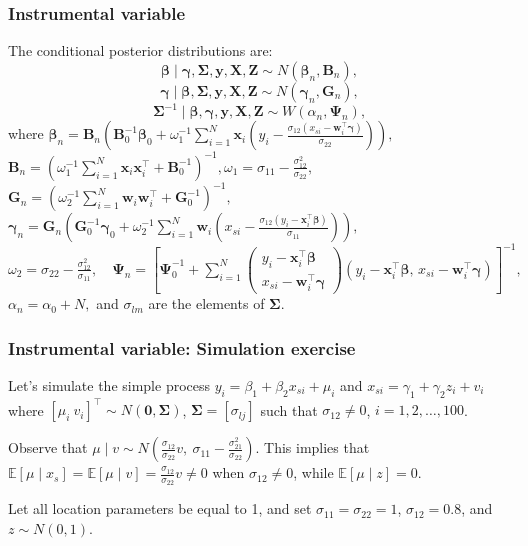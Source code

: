 \documentclass[12pt, compress]{beamer}
\begin{document}
\begin{frame}
	\frametitle{Instrumental variable}
The conditional posterior distributions are:
\begin{equation*}
	\bm{\beta} \mid \bm{\gamma}, \bm{\Sigma}, \bm{y}, \bm{X}, \bm{Z} \sim N(\bm{\beta}_n, \bm{B}_n),
\end{equation*}
\begin{equation*}
	\bm{\gamma} \mid \bm{\beta}, \bm{\Sigma}, \bm{y}, \bm{X}, \bm{Z} \sim N(\bm{\gamma}_n, \bm{G}_n),
\end{equation*}
\begin{equation*}
	\bm{\Sigma}^{-1} \mid \bm{\beta}, \bm{\gamma}, \bm{y}, \bm{X}, \bm{Z} \sim W(\alpha_n, \bm{\Psi}_n),
\end{equation*}
where
{\scriptsize{
\(
\bm{\beta}_n = \bm{B}_n \left( \bm{B}_0^{-1} \bm{\beta}_0 
+ \omega_1^{-1} \sum_{i=1}^{N} 
\bm{x}_i \left( y_i - \frac{\sigma_{12}(x_{si} - \bm{w}_i^{\top}\bm{\gamma})}{\sigma_{22}} \right) \right),
\)
\(
\bm{B}_n = \left( \omega_1^{-1} \sum_{i=1}^{N} \bm{x}_i \bm{x}_i^{\top} + \bm{B}_0^{-1} \right)^{-1}, \omega_1 = \sigma_{11} - \frac{\sigma_{12}^2}{\sigma_{22}},
\)
\(
\bm{G}_n = \left( \omega_2^{-1} \sum_{i=1}^{N} \bm{w}_i \bm{w}_i^{\top} + \bm{G}_0^{-1} \right)^{-1},\) 
\(\bm{\gamma}_n = \bm{G}_n \left( \bm{G}_0^{-1} \bm{\gamma}_0 
+ \omega_2^{-1} \sum_{i=1}^{N} 
\bm{w}_i \left( x_{si} - \frac{\sigma_{12}(y_i - \bm{x}_i^{\top}\bm{\beta})}{\sigma_{11}} \right) \right),
\)
\(
\omega_2 = \sigma_{22} - \frac{\sigma_{12}^2}{\sigma_{11}}, 
\quad 
\bm{\Psi}_n = \left[ \bm{\Psi}_0^{-1} 
+ \sum_{i=1}^N 
\begin{pmatrix} 
	y_i - \bm{x}_i^{\top}\bm{\beta} \\ 
	x_{si} - \bm{w}_i^{\top}\bm{\gamma} 
\end{pmatrix} 
(y_i - \bm{x}_i^{\top}\bm{\beta},\, x_{si} - \bm{w}_i^{\top}\bm{\gamma}) 
\right]^{-1},
\)
\(
\alpha_n = \alpha_0 + N,
\) and $\sigma_{lm}$ are the elements of $\bm{\Sigma}$.
}}
\end{frame}

\begin{frame}
	\frametitle{Instrumental variable: Simulation exercise}
Let's simulate the simple process $y_i=\beta_1+\beta_2x_{si}+\mu_i$ and $x_{si}=\gamma_1+\gamma_2z_i+v_i$ where $[\mu_i \ v_i]^{\top}\sim N(\bm{0},\bm{\Sigma})$, $\bm{\Sigma}=[\sigma_{lj}]$ such that $\sigma_{12}\neq 0$, $i=1,2,\dots,100$.

Observe that $\mu \mid v \sim N\left(\frac{\sigma_{12}}{\sigma_{22}}v,\ \sigma_{11} - \frac{\sigma_{21}^2}{\sigma_{22}}\right)$. This implies that $\mathbb{E}[\mu \mid x_s] = \mathbb{E}[\mu \mid v] = \frac{\sigma_{12}}{\sigma_{22}}v \neq 0$ when $\sigma_{12} \neq 0$, while $\mathbb{E}[\mu \mid z] = 0$.

Let all location parameters be equal to 1, and set $\sigma_{11} = \sigma_{22} = 1$, $\sigma_{12} = 0.8$, and $z \sim N(0,1)$.
\end{frame}
\end{document}
